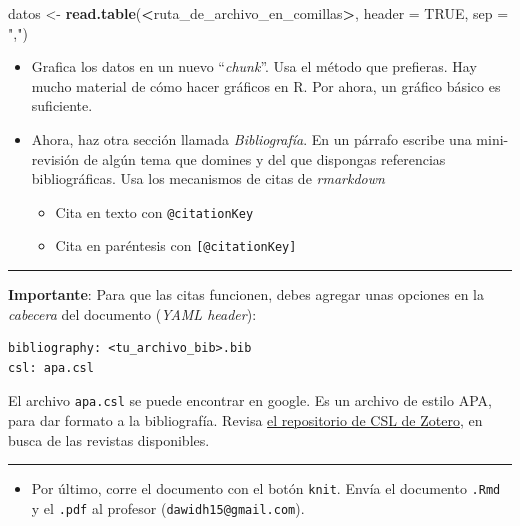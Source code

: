 \documentclass[12pt,letterpaper,]{book}
\newenvironment{Shaded}{\begin{snugshade}}{\end{snugshade}}
\newcommand{\KeywordTok}[1]{\textcolor[rgb]{0.13,0.29,0.53}{\textbf{#1}}}
\newcommand{\DataTypeTok}[1]{\textcolor[rgb]{0.13,0.29,0.53}{#1}}
\newcommand{\StringTok}[1]{\textcolor[rgb]{0.31,0.60,0.02}{#1}}
\newcommand{\OtherTok}[1]{\textcolor[rgb]{0.56,0.35,0.01}{#1}}
\newcommand{\OperatorTok}[1]{\textcolor[rgb]{0.81,0.36,0.00}{\textbf{#1}}}
\newcommand{\NormalTok}[1]{#1}
\providecommand{\tightlist}{%
  \setlength{\itemsep}{0pt}\setlength{\parskip}{0pt}}
\begin{document}
\begin{Shaded}
\begin{Highlighting}[]
\NormalTok{datos <-}\StringTok{ }\KeywordTok{read.table}\NormalTok{(}\OperatorTok{<}\NormalTok{ruta_de_archivo_en_comillas}\OperatorTok{>}\NormalTok{,}
                    \DataTypeTok{header =} \OtherTok{TRUE}\NormalTok{,}
                    \DataTypeTok{sep =} \StringTok{","}\NormalTok{)}
\end{Highlighting}
\end{Shaded}

\begin{itemize}
\item
  Grafica los datos en un nuevo ``\emph{chunk}''. Usa el método que
  prefieras. Hay mucho material de cómo hacer gráficos en R. Por ahora,
  un gráfico básico es suficiente.
\item
  Ahora, haz otra sección llamada \emph{Bibliografía}. En un párrafo
  escribe una mini-revisión de algún tema que domines y del que
  dispongas referencias bibliográficas. Usa los mecanismos de citas de
  \emph{rmarkdown}

  \begin{itemize}
  \item
    Cita en texto con \texttt{@citationKey}
  \item
    Cita en paréntesis con \texttt{{[}@citationKey{]}}
  \end{itemize}
\end{itemize}

\begin{center}\rule{0.5\linewidth}{\linethickness}\end{center}

\textbf{Importante}: Para que las citas funcionen, debes agregar unas
opciones en la \emph{cabecera} del documento (\emph{YAML header}):

\begin{verbatim}
bibliography: <tu_archivo_bib>.bib
csl: apa.csl
\end{verbatim}

El archivo \texttt{apa.csl} se puede encontrar en google. Es un archivo
de estilo APA, para dar formato a la bibliografía. Revisa
\href{https://www.zotero.org/styles}{el repositorio de CSL de Zotero},
en busca de las revistas disponibles.

\begin{center}\rule{0.5\linewidth}{\linethickness}\end{center}

\begin{itemize}
\tightlist
\item
  Por último, corre el documento con el botón \texttt{knit}. Envía el
  documento \texttt{.Rmd} y el \texttt{.pdf} al profesor
  (\texttt{dawidh15@gmail.com}).
\end{itemize}
\end{document}
